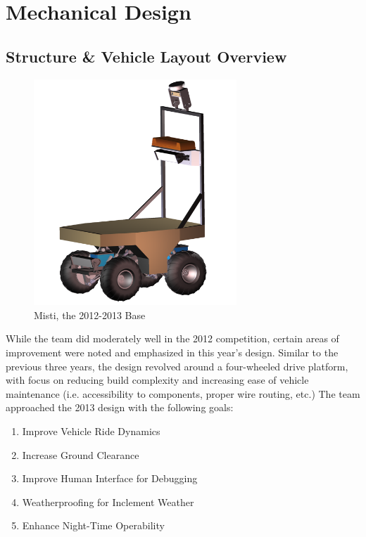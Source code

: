 \section{Mechanical Design}

\subsection{Structure \& Vehicle Layout Overview}


\begin{figure}[H]
\begin{center}
\includegraphics[width=3in]{./Pics/Misti_Vehicle.png}
\caption{Misti, the 2012-2013 Base}

\label{FIG:Misti}
\end{center}
\end{figure}

While the team did moderately well in the 2012 competition, certain areas of improvement were noted and emphasized in this year’s design. Similar to the previous three years, the design revolved around a four-wheeled drive platform, with focus on reducing build complexity and increasing ease of vehicle maintenance (i.e. accessibility to components, proper wire routing, etc.) The team approached the 2013 design with the following goals:

\begin{enumerate}
\item Improve Vehicle Ride Dynamics
\item Increase Ground Clearance
\item Improve Human Interface for Debugging
\item Weatherproofing for Inclement Weather 
\item Enhance Night-Time Operability
\end{enumerate}

